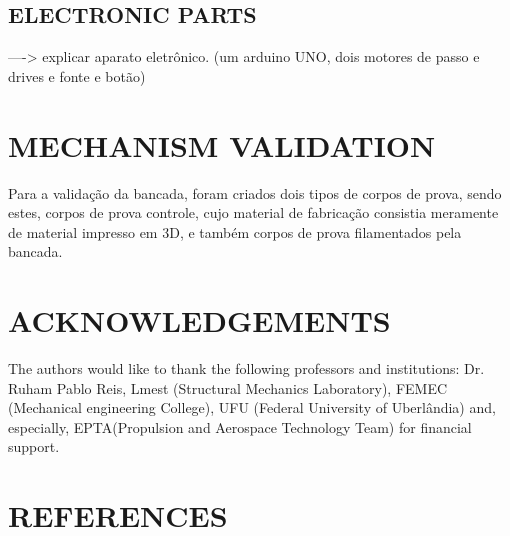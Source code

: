 \documentclass[10pt,fleqn,a4paper,twoside]{article}
\begin{document}
\subsection{ELECTRONIC PARTS}

----> explicar aparato eletrônico. (um arduino UNO, dois motores de passo e drives e fonte e botão)

\section{MECHANISM VALIDATION}
Para a validação da bancada, foram criados dois tipos de corpos de prova, sendo estes, corpos de prova controle, cujo material de fabricação consistia meramente de material impresso em 3D, e também corpos de prova filamentados pela bancada.







\section{ACKNOWLEDGEMENTS}
The authors would like to thank the following professors and institutions: Dr. Ruham Pablo Reis, Lmest (Structural Mechanics Laboratory), FEMEC (Mechanical engineering College), UFU (Federal University of Uberl\^andia) and, especially, EPTA(Propulsion and Aerospace Technology Team) for financial support.

\section{REFERENCES} 


\renewcommand{\refname}{}

\end{document}
